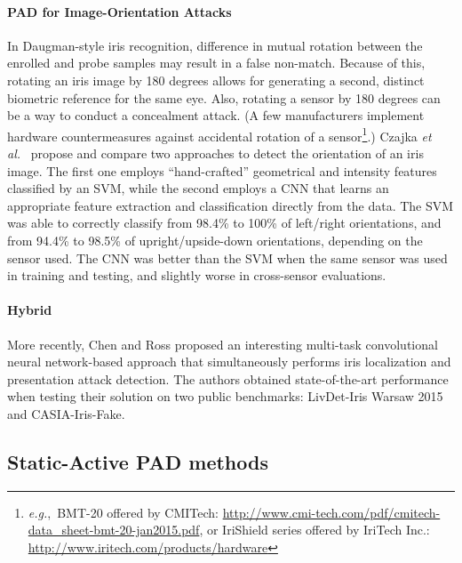 \documentclass[format=acmsmall, review=false, timestamp=false]{acmart}
\newcommand{\eg}{{\it e.g.},~}
\newcommand{\etal}{{\it et al.}~}
\begin{document}
\paragraph{PAD for Image-Orientation Attacks}

In Daugman-style iris recognition, difference in mutual rotation between the enrolled and probe samples may result in a false non-match. Because of this, rotating an iris image by 180 degrees allows for generating a second, distinct biometric reference for the same eye.  Also, rotating a sensor by 180 degrees can be a way to conduct a concealment attack{.} (A few manufacturers implement hardware countermeasures against accidental rotation of a sensor\footnote{\eg BMT-20 offered by CMITech: \url{http://www.cmi-tech.com/pdf/cmitech-data_sheet-bmt-20-jan2015.pdf}, or IriShield series offered by IriTech Inc.: \url{http://www.iritech.com/products/hardware}}.) Czajka \etal \cite{Czajka_TIFS_2017} propose and compare two approaches to detect the orientation of an iris image. The first one employs ``hand-crafted'' geometrical and intensity features classified by an SVM, while the second employs a CNN that learns an appropriate feature extraction and classification directly from the data. The SVM was able to correctly classify from 98.4\% to 100\% of left/right orientations, and from 94.4\% to 98.5\% of upright/upside-down orientations, depending on the sensor used. The CNN was better than the SVM when the same sensor was used in training and testing, and slightly worse in cross-sensor evaluations. 

\paragraph{Hybrid}

{More recently, Chen and Ross \cite{Chen_WACV_2018} proposed an interesting multi-task convolutional neural network-based approach that simultaneously performs iris localization and presentation attack detection. The authors obtained state-of-the-art performance when testing their solution on two public benchmarks: {\sf LivDet-Iris Warsaw 2015} and {\sf CASIA-Iris-Fake}.}




\subsection{Static-Active PAD methods}
\label{sec:PADmethods_StaticActive}
\end{document}
